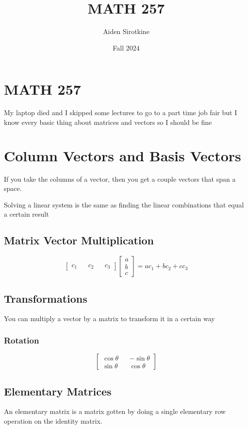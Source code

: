 \documentclass[fleqn]{report}
\date{Fall 2024}
\title{MATH 257}
\author{Aiden Sirotkine}
\begin{document}
\pagestyle{fancy}
\maketitle
\tableofcontents
\clearpage

\chapter{MATH 257}
My laptop died and I skipped some lectures to go to a part time 
job fair but I know every basic thing about matrices and vectors 
so I should be fine 

\chapter{Column Vectors and Basis Vectors} 
If you take the columns of a vector, then you get a couple vectors 
that span a space.

Solving a linear system is the same as finding the linear combinations 
that equal a certain result

\section{Matrix Vector Multiplication}
\[
\begin{bmatrix}
    c_1 && c_2 && c_3
\end{bmatrix}
\begin{bmatrix} a \\ b \\ c \end{bmatrix} =
a c_1 + b c_2 + c c_3
\]

\section{Transformations}
You can multiply a vector by a matrix to transform it in a certain 
way

\subsection{Rotation}
\[
\begin{bmatrix}
\cos \theta && - \sin \theta \\
\sin \theta && \cos \theta
\end{bmatrix}
\]

\section{Elementary Matrices}
An elementary matrix is a matrix gotten by doing a single elementary 
row operation on the identity matrix.
\end{document}
